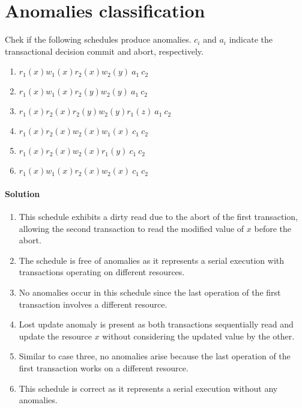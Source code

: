 \section{Anomalies classification}

Chek if the following schedules produce anomalies. 
$c_i$ and $a_i$ indicate the transactional decision commit and abort, respectively.
\begin{enumerate}
    \item $r_1(x) w_1(x) r_2(x) w_2(y)\:a_1\:c_2$
    \item $r_1(x) w_1(x) r_2(y) w_2(y)\:a_1\:c_2$
    \item $r_1(x) r_2(x) r_2(y) w_2(y) r_1(z)\:a_1\:c_2$
    \item $r_1(x) r_2(x) w_2(x) w_1(x)\:c_1\:c_2$
    \item $r_1(x) r_2(x) w_2(x) r_1(y)\:c_1\:c_2$
    \item $r_1(x) w_1(x) r_2(x) w_2(x)\:c_1\:c_2$
\end{enumerate}

\paragraph*{Solution}
\begin{enumerate}
    \item This schedule exhibits a dirty read due to the abort of the first transaction, allowing the second transaction to read the modified value of $x$ before the abort.
    \item The schedule is free of anomalies as it represents a serial execution with transactions operating on different resources.
    \item No anomalies occur in this schedule since the last operation of the first transaction involves a different resource.
    \item Lost update anomaly is present as both transactions sequentially read and update the resource $x$ without considering the updated value by the other.
    \item Similar to case three, no anomalies arise because the last operation of the first transaction works on a different resource.
    \item This schedule is correct as it represents a serial execution without any anomalies.
\end{enumerate}